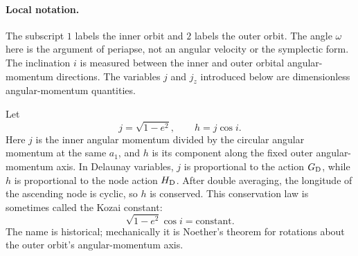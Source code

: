 \paragraph{Local notation.}
The subscript \(1\) labels the inner orbit and \(2\) labels the outer orbit.
The angle \(\omega\) here is the argument of periapse, not an angular velocity
or the symplectic form.  The inclination \(i\) is measured between the inner
and outer orbital angular-momentum directions.  The variables \(j\) and \(j_z\)
introduced below are dimensionless angular-momentum quantities.

Let
\[
  j=\sqrt{1-e^2},
  \qquad
  h=j\cos i.
\]
Here \(j\) is the inner angular momentum divided by the circular angular
momentum at the same \(a_1\), and \(h\) is its component along the fixed outer
angular-momentum axis.  In Delaunay variables, \(j\) is proportional to the
action \(G_{\rm D}\), while \(h\) is proportional to the node action \(H_{\rm
D}\).  After double averaging, the longitude of the ascending node is cyclic,
so \(h\) is conserved.  This conservation law is sometimes called the Kozai
constant:
\[
  \boxed{\sqrt{1-e^2}\cos i=\text{constant}.}
\]
The name is historical; mechanically it is Noether's theorem for rotations
about the outer orbit's angular-momentum axis.

